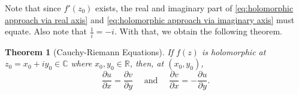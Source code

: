 \documentclass[11pt, oneside]{book}
\theoremstyle{break}
\newtheorem{thm}{Theorem}[section]
\begin{document}
Note that since $f'(z_0)$ exists, the real and imaginary part of \cref{eq:holomorphic approach via real axis} and \cref{eq:holomorphic approach via imaginary axis} must equate. Also note that $\frac{1}{i} = -i$. With that, we obtain the following theorem.

\begin{thm}[Cauchy-Riemann Equations]\label{thm:cauchy_riemann_equations}
	If $f(z)$ is holomorphic at $z_0 = x_0 + iy_0 \in \mathbb{C}$ where $x_0, y_0 \in \mathbb{R}$, then, at $(x_0, y_0)$,
	\begin{equation}\label{eq:cauchy_riemann_equations}
		\frac{\partial u}{\partial x} = \frac{\partial v}{\partial y} \quad \text{ and } \quad \frac{\partial v}{\partial x} = - \frac{\partial u}{\partial y}.
	\end{equation}
\end{thm}
\end{document}
